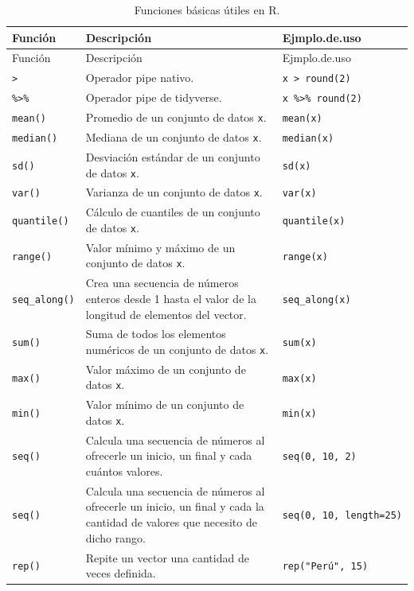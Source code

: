 \documentclass[
]{article}
\theoremstyle{definition}
\theoremstyle{definition}
\theoremstyle{definition}
\theoremstyle{definition}
\theoremstyle{remark}
\begin{document}
\begin{longtable}[]{@{}lll@{}}
\caption{\label{tab:unnamed-chunk-19}Funciones básicas útiles en R.}\tabularnewline
\toprule()
Función & Descripción & Ejmplo.de.uso \\
\midrule()
\endfirsthead
\toprule()
Función & Descripción & Ejmplo.de.uso \\
\midrule()
\endhead
\texttt{\textbar{}\textgreater{}} & Operador pipe nativo. & \texttt{x\ \textbar{}\textgreater{}\ round(2)} \\
\texttt{\%\textgreater{}\%} & Operador pipe de tidyverse. & \texttt{x\ \%\textgreater{}\%\ round(2)} \\
\texttt{mean()} & Promedio de un conjunto de datos \texttt{x}. & \texttt{mean(x)} \\
\texttt{median()} & Mediana de un conjunto de datos \texttt{x}. & \texttt{median(x)} \\
\texttt{sd()} & Desviación estándar de un conjunto de datos \texttt{x}. & \texttt{sd(x)} \\
\texttt{var()} & Varianza de un conjunto de datos \texttt{x}. & \texttt{var(x)} \\
\texttt{quantile()} & Cálculo de cuantiles de un conjunto de datos \texttt{x}. & \texttt{quantile(x)} \\
\texttt{range()} & Valor mínimo y máximo de un conjunto de datos \texttt{x}. & \texttt{range(x)} \\
\texttt{seq\_along()} & Crea una secuencia de números enteros desde 1 hasta el valor de la longitud de elementos del vector. & \texttt{seq\_along(x)} \\
\texttt{sum()} & Suma de todos los elementos numéricos de un conjunto de datos \texttt{x}. & \texttt{sum(x)} \\
\texttt{max()} & Valor máximo de un conjunto de datos \texttt{x}. & \texttt{max(x)} \\
\texttt{min()} & Valor mínimo de un conjunto de datos \texttt{x}. & \texttt{min(x)} \\
\texttt{seq()} & Calcula una secuencia de números al ofrecerle un inicio, un final y cada cuántos valores. & \texttt{seq(0,\ 10,\ 2)} \\
\texttt{seq()} & Calcula una secuencia de números al ofrecerle un inicio, un final y cada la cantidad de valores que necesito de dicho rango. & \texttt{seq(0,\ 10,\ length=25)} \\
\texttt{rep()} & Repite un vector una cantidad de veces definida. & \texttt{rep("Perú",\ 15)} \\

\end{longtable}
\end{document}
